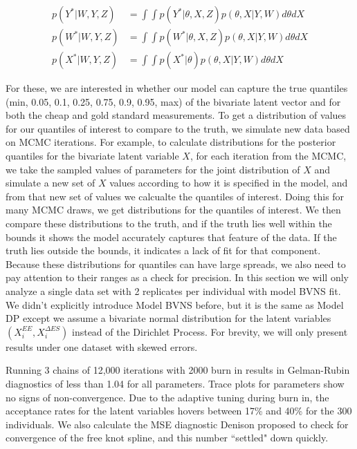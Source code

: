 \documentclass[11pt]{article}\usepackage[]{graphicx}\usepackage[]{color}
\begin{document}
\begin{align}
  \label{ypostpred}
  p(Y^*|W,Y,Z) &= \int \int p(Y^*|\theta,X,Z) p(\theta, X|Y,W) d\theta dX \\
  \label{wpostpred}
  p(W^*|W,Y,Z) &= \int \int p(W^*|\theta,X,Z) p(\theta, X|Y,W) d\theta dX \\
  \label{xpostpred}
  p(X^*|W,Y,Z) &= \int \int p(X^*|\theta) p(\theta, X|Y,W) d\theta dX
\end{align}


For these, we are interested in whether our model can capture the true quantiles (min, 0.05, 0.1, 0.25, 0.75, 0.9, 0.95, max) of the bivariate latent vector and for both the cheap and gold standard measurements. To get a distribution of values for our quantiles of interest to compare to the truth, we simulate new data based on MCMC iterations. For example, to calculate distributions for the posterior quantiles for the bivariate latent variable $X$, for each iteration from the MCMC, we  take the sampled values of parameters for the joint distribution of $X$ and simulate a new set of $X$ values according to how it is specified in the model, and from that new set of values we calcualte the quantiles of interest. Doing this for many MCMC draws, we get distributions for the quantiles of interest. We then compare these distributions to the truth, and if the truth lies well within the bounds it shows the model accurately captures that feature of the data. If the truth lies outside the bounds, it indicates a lack of fit for that component. Because these distributions for quantiles can have large spreads, we also need to pay attention to their ranges as a check for precision. In this section we will only analyze a single data set with 2 replicates per individual with model BVNS fit. We didn't explicitly introduce Model BVNS before, but it is the same as Model DP except we assume a bivariate normal distribution for the latent variables $(X_i^{EE},X_i^{\Delta ES})$ instead of the Dirichlet Process. For brevity, we will only present results under one dataset with skewed errors. 

Running 3 chains of 12,000 iterations with 2000 burn in results in Gelman-Rubin diagnostics of less than 1.04 for all parameters. Trace plots for parameters show no signs of non-convergence. Due to the adaptive tuning during burn in, the acceptance rates for the latent variables hovers between 17\% and 40\% for the 300 individuals. We also calculate the MSE diagnostic Denison proposed to check for convergence of the free knot spline, and this number ``settled" down quickly. 
\end{document}
